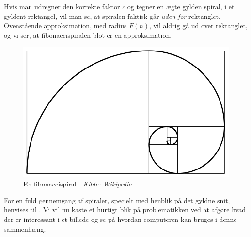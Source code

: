 {Hvis man udregner den korrekte faktor $c$ og tegner en ægte gylden
spiral, i et gyldent rektangel, vil man se, at spiralen faktisk går
\emph{uden for} rektanglet\cite{Sharp2002}. Ovenstående approksimation,
med radius $F(n)$, vil aldrig gå ud over rektanglet, og vi ser, at
fibonaccispiralen blot er en approksimation.

\begin{figure}[!h]
    \centering
	\includegraphics[scale=0.35,angle=0]{afsnit/baggrund/billeder/Fibonacci_spiral}
	\caption[En fibonaccispiral]{En fibonaccispiral - \emph{Kilde: Wikipedia}}
	\label{fibonacci_spiral}
\end{figure}

For en fuld gennemgang af spiraler, specielt med henblik på det gyldne
snit, henvises til \cite{Sharp2002}. Vi vil nu kaste et hurtigt blik på
problematikken ved at afgøre hvad der er interessant i et billede og se
på hvordan computeren kan bruges i denne sammenhæng.

}
